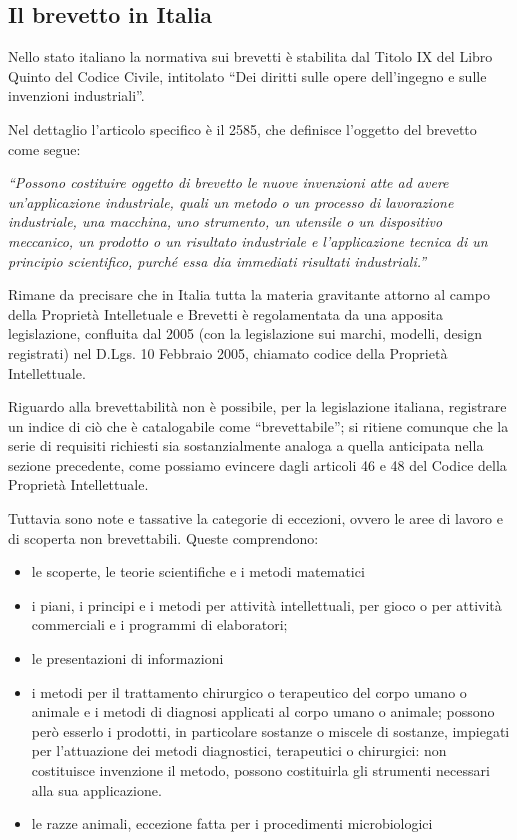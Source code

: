 \subsection{Il brevetto in Italia}
Nello stato italiano la normativa sui brevetti è stabilita dal Titolo IX del Libro Quinto del Codice Civile, intitolato ``Dei diritti sulle opere dell'ingegno e sulle invenzioni industriali''.

Nel dettaglio l'articolo specifico è il 2585, che definisce l'oggetto del brevetto come segue:

\textit{``Possono costituire oggetto di brevetto le nuove invenzioni atte ad avere un'applicazione industriale, quali un metodo o un processo di lavorazione industriale, una macchina, uno strumento, un utensile o un dispositivo meccanico, un prodotto o un risultato industriale e l'applicazione tecnica di un principio scientifico, purché essa dia immediati risultati industriali.''}

Rimane da precisare che in Italia tutta la materia gravitante attorno al campo della Proprietà Intelletuale e Brevetti è regolamentata da una apposita legislazione, confluita dal 2005 (con la legislazione sui marchi, modelli, design registrati) nel D.Lgs. 10 Febbraio 2005, chiamato codice della Proprietà Intellettuale.

Riguardo alla brevettabilità non è possibile, per la legislazione italiana, registrare un indice di ciò che è catalogabile come ``brevettabile''; si ritiene comunque che la serie di requisiti richiesti sia sostanzialmente analoga a quella anticipata nella sezione precedente, come possiamo evincere dagli articoli 46 e 48 del Codice della Proprietà Intellettuale.

Tuttavia sono note e tassative la categorie di eccezioni, ovvero le aree di lavoro e di scoperta non brevettabili. Queste comprendono:
\begin{itemize}
\item le scoperte, le teorie scientifiche e i metodi matematici
\item i piani, i principi e i metodi per attività intellettuali, per gioco o per attività commerciali e i programmi di elaboratori;
\item le presentazioni di informazioni
\item i metodi per il trattamento chirurgico o terapeutico del corpo umano o animale e i metodi di diagnosi applicati al corpo umano o animale; possono però esserlo i prodotti, in particolare sostanze o miscele di sostanze, impiegati per l'attuazione dei metodi diagnostici, terapeutici o chirurgici: non costituisce invenzione il metodo, possono costituirla gli strumenti necessari alla sua applicazione.
\item le razze animali, eccezione fatta per i procedimenti microbiologici\end{itemize}

